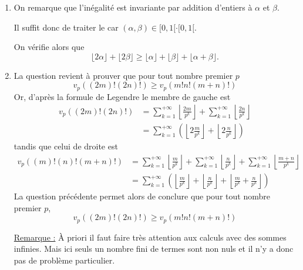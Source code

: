 \begin{sol}
\begin{enumerate}
\item On remarque que l'inégalité est invariante par addition d'entiers à $\alpha$ et $\beta$.

Il suffit donc de traiter le car $(\alpha,\beta) \in [0,1[ \cdot [0,1[$.

On vérifie alors que
$$\boxed{\lfloor 2 \alpha \rfloor  + \lfloor  2\beta\rfloor \ge \lfloor \alpha \rfloor + \lfloor \beta \rfloor + \lfloor \alpha + \beta \rfloor}. $$
\item La question revient à prouver que pour tout nombre premier $p$
$$v_p \left((2m)! (2n)! \right) \ge v_p\left( m! n! (m+n)!\right)$$
Or, d'après la formule de Legendre le membre de gauche est
$$\begin{aligned}
  v_p \left((2m)! (2n)! \right) & = \sum_{k=1}^{+ \infty} \left\lfloor \frac{2m}{p^k} \right\rfloor + \sum_{k=1}^{+ \infty} \left\lfloor \frac{2n}{p^k} \right\rfloor\\
  & = \sum_{k=1}^{+\infty} \left(\left\lfloor 2 \frac m{p^k} \right\rfloor + \left\lfloor 2 \frac n{p^k} \right\rfloor\right)
\end{aligned}$$
tandis que celui de droite est
$$\begin{aligned}
  v_p \left((m)! (n)!(m+n)! \right) & = \sum_{k=1}^{+ \infty} \left\lfloor \frac m{p^k} \right\rfloor + \sum_{k=1}^{+ \infty} \left\lfloor \frac n{p^k} \right\rfloor+ \sum_{k=1}^{+ \infty} \left\lfloor \frac{m+n}{p^k} \right\rfloor\\
  & = \sum_{k=1}^{+\infty} \left(\left\lfloor  \frac m{p^k} \right\rfloor + \left\lfloor \frac n{p^k} \right\rfloor+ \left\lfloor \frac m{p^k} +\frac n{p^k} \right\rfloor\right)
\end{aligned}$$
La question précédente permet alors de conclure que pour tout nombre premier $p$,
$$\boxed{v_p \left((2m)! (2n)! \right) \ge v_p\left( m! n! (m+n)!\right)}$$

\underline{Remarque :} À priori il faut faire très attention aux calculs avec des sommes infinies. Mais ici seuls {un nombre fini de termes sont non nuls} et il n'y a donc pas de problème particulier.
\end{enumerate}
\end{sol}

